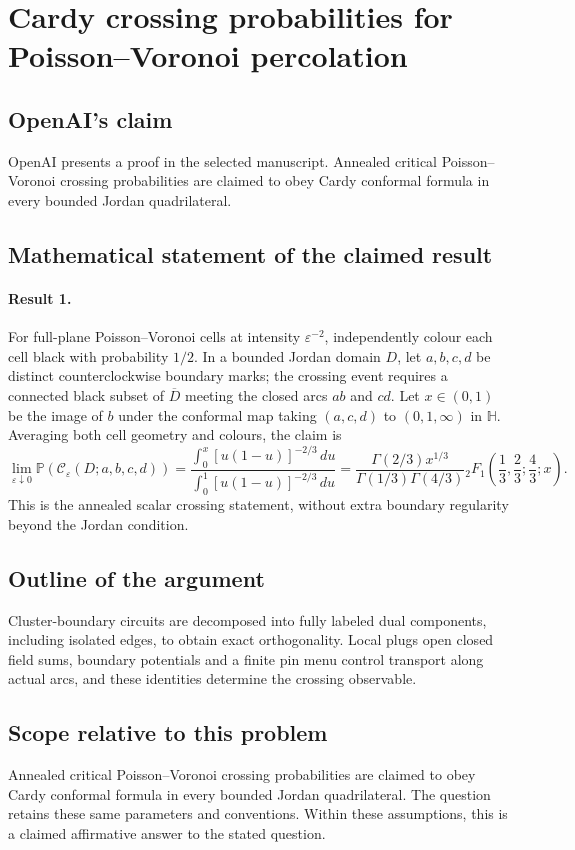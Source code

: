 \documentclass[11pt]{article}
\begin{document}
\section*{Cardy crossing probabilities for Poisson–Voronoi percolation}

\subsection{OpenAI's claim}
OpenAI presents a proof in the selected manuscript. Annealed critical Poisson--Voronoi crossing probabilities are claimed to obey Cardy conformal formula in every bounded Jordan quadrilateral.

\subsection{Mathematical statement of the claimed result}
\paragraph{Result 1.} For full-plane Poisson--Voronoi cells at intensity $\varepsilon^{-2}$, independently colour each cell black with probability $1/2$. In a bounded Jordan domain $D$, let $a,b,c,d$ be distinct counterclockwise boundary marks; the crossing event requires a connected black subset of $\overline D$ meeting the closed arcs $ab$ and $cd$. Let $x\in(0,1)$ be the image of $b$ under the conformal map taking $(a,c,d)$ to $(0,1,\infty)$ in $\mathbb H$. Averaging both cell geometry and colours, the claim is
\[
 \lim_{\varepsilon\downarrow0}\mathbb P(\mathcal C_\varepsilon(D;a,b,c,d))
 =\frac{\int_0^x[u(1-u)]^{-2/3}\,du}{\int_0^1[u(1-u)]^{-2/3}\,du}
 =\frac{\Gamma(2/3)x^{1/3}}{\Gamma(1/3)\Gamma(4/3)}
 {}_2F_1\left(\frac13,\frac23;\frac43;x\right).
\]
This is the annealed scalar crossing statement, without extra boundary regularity beyond the Jordan condition.

\subsection{Outline of the argument}
Cluster-boundary circuits are decomposed into fully labeled dual components, including isolated edges, to obtain exact orthogonality. Local plugs open closed field sums, boundary potentials and a finite pin menu control transport along actual arcs, and these identities determine the crossing observable.

\subsection{Scope relative to this problem}
Annealed critical Poisson--Voronoi crossing probabilities are claimed to obey Cardy conformal formula in every bounded Jordan quadrilateral. The question retains these same parameters and conventions. Within these assumptions, this is a claimed affirmative answer to the stated question.
\end{document}
